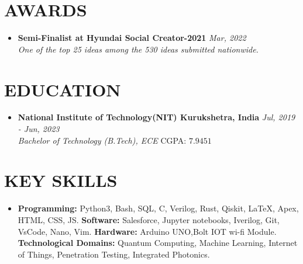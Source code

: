 \documentclass[12pt]{my_cv}
\begin{document}
\section{AWARDS}
\begin{itemize}
\item \textbf{Semi-Finalist at Hyundai Social Creator-2021} \hfill \textit{Mar, 2022}
\\\textit{One of the top 25 ideas among the 530 ideas submitted nationwide.}
\end{itemize}
\section{EDUCATION}
\begin{itemize}
\item \textbf{National Institute of Technology(NIT) Kurukshetra, India} \hfill \textit{Jul, 2019 - Jun, 2023}
\\\textit{Bachelor of Technology (B.Tech), ECE}  \hfill CGPA: $7.9451$
\end{itemize}
\section{KEY SKILLS}
\begin{itemize}
\item \textbf{Programming:} Python3, Bash, SQL, C, Verilog, Rust, Qiskit, \LaTeX, Apex, HTML, CSS, JS. 
\textbf{Software:} Salesforce, Jupyter notebooks, Iverilog, Git, VsCode, Nano, Vim. 
\textbf{Hardware:} Arduino UNO,Bolt IOT wi-fi Module. 
\textbf{Technological Domains:} Quantum Computing, Machine Learning, Internet of Things, Penetration Testing, Integrated
Photonics.
\end{itemize}
\end{document}
